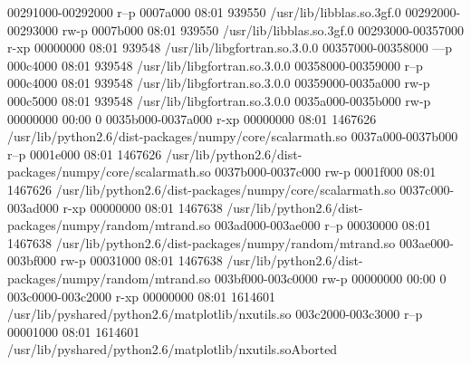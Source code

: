 00291000-00292000 r--p 0007a000 08:01 939550     /usr/lib/libblas.so.3gf.0
00292000-00293000 rw-p 0007b000 08:01 939550     /usr/lib/libblas.so.3gf.0
00293000-00357000 r-xp 00000000 08:01 939548     /usr/lib/libgfortran.so.3.0.0
00357000-00358000 ---p 000c4000 08:01 939548     /usr/lib/libgfortran.so.3.0.0
00358000-00359000 r--p 000c4000 08:01 939548     /usr/lib/libgfortran.so.3.0.0
00359000-0035a000 rw-p 000c5000 08:01 939548     /usr/lib/libgfortran.so.3.0.0
0035a000-0035b000 rw-p 00000000 00:00 0 
0035b000-0037a000 r-xp 00000000 08:01 1467626    /usr/lib/python2.6/dist-packages/numpy/core/scalarmath.so
0037a000-0037b000 r--p 0001e000 08:01 1467626    /usr/lib/python2.6/dist-packages/numpy/core/scalarmath.so
0037b000-0037c000 rw-p 0001f000 08:01 1467626    /usr/lib/python2.6/dist-packages/numpy/core/scalarmath.so
0037c000-003ad000 r-xp 00000000 08:01 1467638    /usr/lib/python2.6/dist-packages/numpy/random/mtrand.so
003ad000-003ae000 r--p 00030000 08:01 1467638    /usr/lib/python2.6/dist-packages/numpy/random/mtrand.so
003ae000-003bf000 rw-p 00031000 08:01 1467638    /usr/lib/python2.6/dist-packages/numpy/random/mtrand.so
003bf000-003c0000 rw-p 00000000 00:00 0 
003c0000-003c2000 r-xp 00000000 08:01 1614601    /usr/lib/pyshared/python2.6/matplotlib/nxutils.so
003c2000-003c3000 r--p 00001000 08:01 1614601    /usr/lib/pyshared/python2.6/matplotlib/nxutils.soAborted
